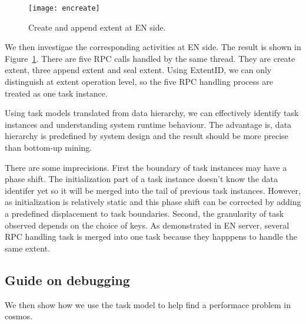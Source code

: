 \begin{figure}
\centering
\texttt{[image: encreate]}
\caption{Create and append extent at EN side.}
\label{fig:encreate}
\end{figure}

We then investigae the corresponding activities at EN side.
The result is shown in Figure~\ref{fig:encreate}. There
are five RPC calls handled by the same thread. They are
create extent, three append extent and seal extent. Using
ExtentID, we can only distinguish at extent operation level,
so the five RPC handling process are treated as one task
instance.

\lesson Using task models translated from data hierarchy, we
can effectively identify task instances and understanding
system runtime behaviour. The advantage is, data
hierarchy is predefined by system design and the result
should be more precise than bottom-up mining.



There are some imprecisions. First the boundary of task
instances may have a phase shift. The initialization part of
a task instance doesn't know the data identifer yet so it
will be merged into the tail of previous task instances.
However, as initialization is relatively static and this
phase shift can be corrected by adding a predefined
displacement to task boundaries. Second, the granularity of
task observed depends on the choice of keys.  As
demonstrated in EN server, several RPC handling task is
merged into one task because they happpens to handle the
same extent.

\subsection{Guide on debugging}

We then show how we use the task model to help find a
performace problem in cosmos.

